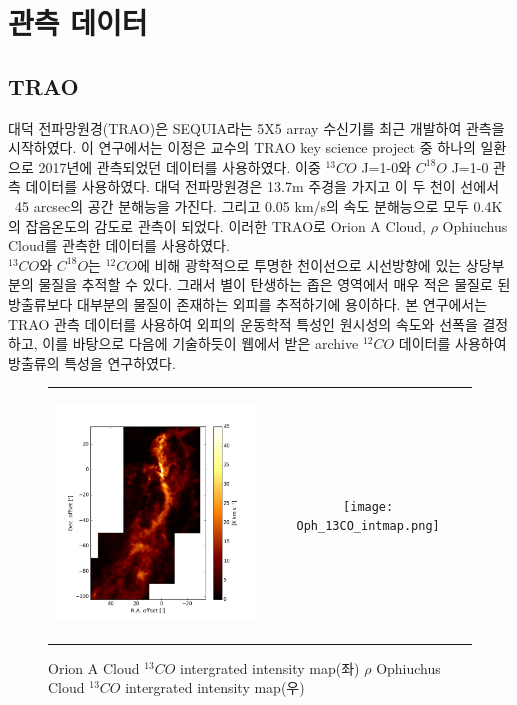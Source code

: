 \section{관측 데이터}

\subsection{TRAO}
대덕 전파망원경(TRAO)은 SEQUIA라는 5X5 array 수신기를 최근 개발하여 관측을 시작하였다. 이 연구에서는 이정은 교수의 TRAO key science project 중 하나의 일환으로 2017년에 관측되었던 데이터를 사용하였다. 이중 $^{13}CO$ J=1-0와 $C^{18}O$ J=1-0 관측 데이터를 사용하였다. 대덕 전파망원경은 13.7m 주경을 가지고 이 두 천이 선에서 ~45 arcsec의 공간 분해능을 가진다. 그리고 0.05 km/s의 속도 분해능으로 모두 0.4K의 잡음온도의 감도로 관측이 되었다. 이러한 TRAO로 Orion A Cloud, $\rho$ Ophiuchus Cloud를 관측한 데이터를 사용하였다.\\
$^{13}CO$와 $C^{18}O$는 $^{12}CO$에 비해 광학적으로 투명한 천이선으로 시선방향에 있는 상당부분의 물질을 추적할 수 있다. 그래서 별이 탄생하는 좁은 영역에서 매우 적은 물질로 된 방출류보다	대부분의 물질이 존재하는 외피를 추적하기에 용이하다. 본 연구에서는 TRAO 관측 데이터를 사용하여 외피의 운동학적 특성인 원시성의 속도와 선폭을 결정하고, 이를 바탕으로 다음에 기술하듯이 웹에서 받은 archive $^{12}CO$ 데이터를 사용하여 방출류의 특성을 연구하였다.

\begin{figure}[h]
	\begin{center}
		\begin{tabular}{cc}
			\includegraphics[height=6.5cm]{Orion_13CO_intmap.png} & \texttt{[image: Oph\_13CO\_intmap.png]}
		\end{tabular}
	\end{center}
	\caption{Orion A Cloud $^{13}CO$ intergrated intensity map(좌) $\rho$ Ophiuchus Cloud $^{13}CO$ intergrated intensity map(우)}
\end{figure}

